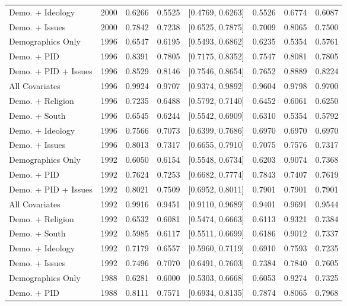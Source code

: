 \begin{longtable}{lrrrlrrr}
  Demo. + Ideology & 2000 & 0.6266 & 0.5525 & [0.4769, 0.6263] & 0.5526 & 0.6774 & 0.6087 \\ 
  Demo. + Issues & 2000 & 0.7842 & 0.7238 & [0.6525, 0.7875] & 0.7009 & 0.8065 & 0.7500 \\ 
  Demographics Only & 1996 & 0.6547 & 0.6195 & [0.5493, 0.6862] & 0.6235 & 0.5354 & 0.5761 \\ 
  Demo. + PID & 1996 & 0.8391 & 0.7805 & [0.7175, 0.8352] & 0.7547 & 0.8081 & 0.7805 \\ 
  Demo. + PID + Issues & 1996 & 0.8529 & 0.8146 & [0.7546, 0.8654] & 0.7652 & 0.8889 & 0.8224 \\ 
  All Covariates & 1996 & 0.9924 & 0.9707 & [0.9374, 0.9892] & 0.9604 & 0.9798 & 0.9700 \\ 
  Demo. + Religion & 1996 & 0.7235 & 0.6488 & [0.5792, 0.7140] & 0.6452 & 0.6061 & 0.6250 \\ 
  Demo. + South & 1996 & 0.6545 & 0.6244 & [0.5542, 0.6909] & 0.6310 & 0.5354 & 0.5792 \\ 
  Demo. + Ideology & 1996 & 0.7566 & 0.7073 & [0.6399, 0.7686] & 0.6970 & 0.6970 & 0.6970 \\ 
  Demo. + Issues & 1996 & 0.8013 & 0.7317 & [0.6655, 0.7910] & 0.7075 & 0.7576 & 0.7317 \\ 
  Demographics Only & 1992 & 0.6050 & 0.6154 & [0.5548, 0.6734] & 0.6203 & 0.9074 & 0.7368 \\ 
  Demo. + PID & 1992 & 0.7624 & 0.7253 & [0.6682, 0.7774] & 0.7843 & 0.7407 & 0.7619 \\ 
  Demo. + PID + Issues & 1992 & 0.8021 & 0.7509 & [0.6952, 0.8011] & 0.7901 & 0.7901 & 0.7901 \\ 
  All Covariates & 1992 & 0.9916 & 0.9451 & [0.9110, 0.9689] & 0.9401 & 0.9691 & 0.9544 \\ 
  Demo. + Religion & 1992 & 0.6532 & 0.6081 & [0.5474, 0.6663] & 0.6113 & 0.9321 & 0.7384 \\ 
  Demo. + South & 1992 & 0.5985 & 0.6117 & [0.5511, 0.6699] & 0.6186 & 0.9012 & 0.7337 \\ 
  Demo. + Ideology & 1992 & 0.7179 & 0.6557 & [0.5960, 0.7119] & 0.6910 & 0.7593 & 0.7235 \\ 
  Demo. + Issues & 1992 & 0.7496 & 0.7070 & [0.6491, 0.7603] & 0.7384 & 0.7840 & 0.7605 \\ 
  Demographics Only & 1988 & 0.6281 & 0.6000 & [0.5303, 0.6668] & 0.6053 & 0.9274 & 0.7325 \\ 
  Demo. + PID & 1988 & 0.8111 & 0.7571 & [0.6934, 0.8135] & 0.7874 & 0.8065 & 0.7968 \\ 

\end{longtable}
